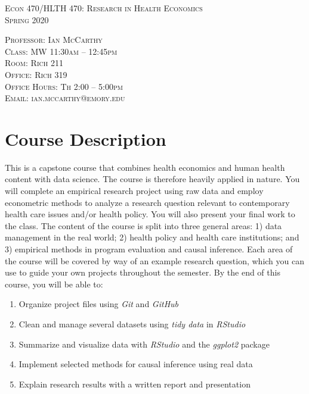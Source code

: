 \documentclass{article}
\begin{document}
\thispagestyle{empty}

\begin{center}
\textsc{\Large{Econ 470/HLTH 470: Research in Health Economics}} \\
\textsc{\large{Spring 2020}}
\end{center}

\noindent \textsc{Professor: Ian McCarthy} \\
\noindent \textsc{Class: MW 11:30am -- 12:45pm} \\
\noindent \textsc{Room: Rich 211}  \\
\noindent \textsc{Office: Rich 319} \\
\noindent \textsc{Office Hours: Th 2:00 -- 5:00pm} \\
\noindent \textsc{Email: ian.mccarthy@emory.edu} \\

\section*{Course Description}
This is a capstone course that combines health economics and human health content with data science. The course is therefore heavily applied in nature. You will complete an empirical research project using raw data and employ econometric methods to analyze a research question relevant to contemporary health care issues and/or health policy. You will also present your final work to the class. The content of the course is split into three general areas: 1) data management in the real world; 2) health policy and health care institutions; and 3) empirical methods in program evaluation and causal inference. Each area of the course will be covered by way of an example research question, which you can use to guide your own projects throughout the semester. By the end of this course, you will be able to:
\begin{enumerate}
 \item Organize project files using \textit{Git} and \textit{GitHub}
 \item Clean and manage several datasets using \textit{tidy data} in \textit{RStudio}
 \item Summarize and visualize data with \textit{RStudio} and the \textit{ggplot2} package
 \item Implement selected methods for causal inference using real data
 \item Explain research results with a written report and presentation
\end{enumerate}
\end{document}
